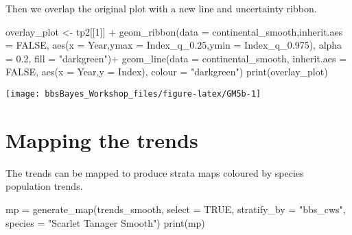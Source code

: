 \documentclass[
]{book}
\newenvironment{Shaded}{\begin{snugshade}}{\end{snugshade}}
\newcommand{\AttributeTok}[1]{\textcolor[rgb]{0.77,0.63,0.00}{#1}}
\newcommand{\ConstantTok}[1]{\textcolor[rgb]{0.00,0.00,0.00}{#1}}
\newcommand{\DecValTok}[1]{\textcolor[rgb]{0.00,0.00,0.81}{#1}}
\newcommand{\FloatTok}[1]{\textcolor[rgb]{0.00,0.00,0.81}{#1}}
\newcommand{\FunctionTok}[1]{\textcolor[rgb]{0.00,0.00,0.00}{#1}}
\newcommand{\NormalTok}[1]{#1}
\newcommand{\OtherTok}[1]{\textcolor[rgb]{0.56,0.35,0.01}{#1}}
\newcommand{\SpecialCharTok}[1]{\textcolor[rgb]{0.00,0.00,0.00}{#1}}
\newcommand{\StringTok}[1]{\textcolor[rgb]{0.31,0.60,0.02}{#1}}
\begin{document}
Then we overlap the original plot with a new line and uncertainty ribbon.

\begin{Shaded}
\begin{Highlighting}[]

\NormalTok{overlay\_plot }\OtherTok{\textless{}{-}}\NormalTok{ tp2[[}\DecValTok{1}\NormalTok{]] }\SpecialCharTok{+}
  \FunctionTok{geom\_ribbon}\NormalTok{(}\AttributeTok{data =}\NormalTok{ continental\_smooth,}\AttributeTok{inherit.aes =} \ConstantTok{FALSE}\NormalTok{,}
              \FunctionTok{aes}\NormalTok{(}\AttributeTok{x =}\NormalTok{ Year,}\AttributeTok{ymax =}\NormalTok{ Index\_q\_0}\FloatTok{.25}\NormalTok{,}\AttributeTok{ymin =}\NormalTok{ Index\_q\_0}\FloatTok{.975}\NormalTok{),}
              \AttributeTok{alpha =} \FloatTok{0.2}\NormalTok{,}
              \AttributeTok{fill =} \StringTok{"darkgreen"}\NormalTok{)}\SpecialCharTok{+}
  \FunctionTok{geom\_line}\NormalTok{(}\AttributeTok{data =}\NormalTok{ continental\_smooth, }\AttributeTok{inherit.aes =} \ConstantTok{FALSE}\NormalTok{,}
            \FunctionTok{aes}\NormalTok{(}\AttributeTok{x =}\NormalTok{ Year,}\AttributeTok{y =}\NormalTok{ Index),}
            \AttributeTok{colour =} \StringTok{"darkgreen"}\NormalTok{)}
\FunctionTok{print}\NormalTok{(overlay\_plot)}
\end{Highlighting}
\end{Shaded}

\begin{center}\texttt{[image: bbsBayes\_Workshop\_files/figure-latex/GM5b-1]} \end{center}

\hypertarget{mapping-the-trends}{%
\section{Mapping the trends}\label{mapping-the-trends}}

The trends can be mapped to produce strata maps coloured by species population trends.

\begin{Shaded}
\begin{Highlighting}[]
\NormalTok{mp }\OtherTok{=} \FunctionTok{generate\_map}\NormalTok{(trends\_smooth,}
                  \AttributeTok{select =} \ConstantTok{TRUE}\NormalTok{,}
                  \AttributeTok{stratify\_by =} \StringTok{"bbs\_cws"}\NormalTok{,}
                  \AttributeTok{species =} \StringTok{"Scarlet Tanager Smooth"}\NormalTok{)}
\FunctionTok{print}\NormalTok{(mp)}
\end{Highlighting}
\end{Shaded}
\end{document}
